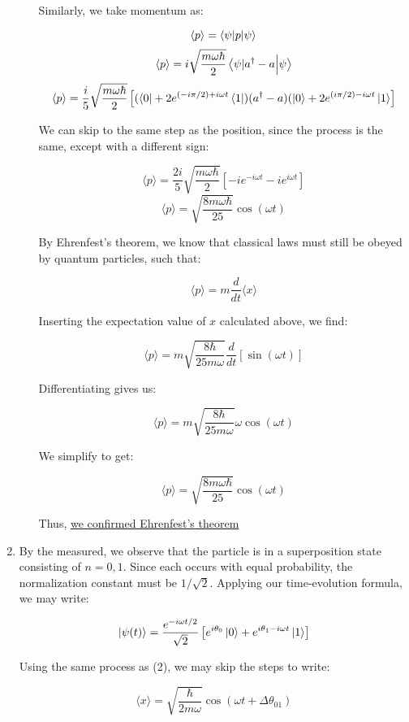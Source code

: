 \begin{enumerate}
\begin{enumerate}
          Similarly, we take momentum as:

          $$\langle p\rangle=\bra{\psi|p}\ket{\psi}$$
          $$\langle p\rangle=i\sqrt{\frac{m\omega\hbar}{2}}\bra{\psi|a^{\dagger} - a}\ket{\psi}$$
          $$\langle p\rangle=\frac{i}{5}\sqrt{\frac{m\omega\hbar}{2}}\left[(\bra{0}+2e^{(-i\pi/2)+i\omega t}\bra{1})(a^{\dagger}-a)(\ket{0}+2e^{(i\pi/2)-i\omega t}\ket{1}\right]$$

          We can skip to the same step as the position, since the process is the same, except with a different sign:

          $$\langle p\rangle=\frac{2i}{5}\sqrt{\frac{m\omega\hbar}{2}}\left[-ie^{-i\omega t}-ie^{i\omega t}\right]$$
          $$\boxed{\langle p\rangle=\sqrt{\frac{8m\omega\hbar}{25}}\cos(\omega t)}$$

          By Ehrenfest's theorem, we know that classical laws must still be obeyed by quantum particles, such that:

          $$\langle p\rangle=m\frac{d}{dt}\langle x\rangle$$

          Inserting the expectation value of $x$ calculated above, we find:

          $$\langle p\rangle = m\sqrt{\frac{8\hbar}{25m\omega}}\frac{d}{dt}[\sin(\omega t)]$$

          Differentiating gives us:

          $$\langle p\rangle = m\sqrt{\frac{8\hbar}{25m\omega}}\omega\cos(\omega t)$$

          We simplify to get:

          $$\langle p\rangle = \sqrt{\frac{8m\omega\hbar}{25}}\cos(\omega t)$$

          Thus, \underline{we confirmed Ehrenfest's theorem}

    \end{enumerate}

  \item By the measured, we observe that the particle is in a superposition state consisting of $n=0,1$. Since each occurs with equal probability, the normalization constant must be $1/\sqrt{2}$. Applying our time-evolution formula, we may write:

    $$\ket{\psi(t)}=\frac{e^{-i\omega t/2}}{\sqrt{2}}\left[ e^{i\theta_0}\ket{0}+e^{i\theta_1-i\omega t}\ket{1} \right]$$

    Using the same process as (2), we may skip the steps to write:

    $$\langle x\rangle=\sqrt{\frac{\hbar}{2m\omega}}\cos(\omega t+\Delta\theta_{01})$$


\end{enumerate}
